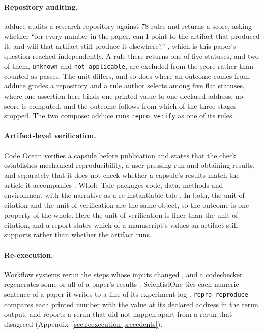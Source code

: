 \documentclass{article}
\newcommand{\code}[1]{\texttt{#1}}
\newcommand{\reproverify}{\code{repro verify}}
\begin{document}
\paragraph{Repository auditing.} adduce audits a research repository against 78 rules and
returns a score, asking whether ``for every number in the paper, can I point to the artifact that
produced it, and will that artifact still produce it elsewhere?'' \citep{chudasama2026adduce}, which
is this paper's question reached independently. A rule there returns one
of five statuses, and two of them, \code{unknown} and \code{not-applicable}, are excluded from the
score rather than counted as passes. The unit differs, and so does where an outcome comes from.
adduce grades a repository and a rule author selects among five flat statuses, where one assertion
here binds one printed value to one declared address, no score is computed, and the outcome follows
from which of the three stages stopped. The two compose: adduce runs \reproverify{} as one of its rules.

\paragraph{Artifact-level verification.} Code Ocean verifies a capsule before publication and
states that the check establishes mechanical reproducibility, a user pressing run and obtaining
results, and separately that it does not check whether a capsule's results match the article it
accompanies \citep{codeocean2026verification}. Whole Tale packages code, data, methods and
environment with the narrative as a re-instantiable tale \citep{brinckman2019wholetale}. In both,
the unit of citation and the unit of verification are the same object, so the outcome is one
property of the whole. Here the unit of verification is finer than the unit of citation, and a
report states which of a manuscript's values an artifact still supports rather than whether the
artifact runs.

\paragraph{Re-execution.} Workflow systems rerun the steps whose inputs changed
\citep{iterative2020dvc,koster2012snakemake}, and a codechecker regenerates some or
all of a paper's results \citep{nust2021codecheck}.
ScientistOne ties each numeric sentence of a paper it writes to a line of its experiment log
\citep{meng2026scientistone}.
\code{repro reproduce} compares each printed number with the value at its declared address in the
rerun output, and reports a rerun that did not happen apart from a rerun that disagreed
(Appendix~\ref{sec:reexecution-precedents}).
\end{document}

